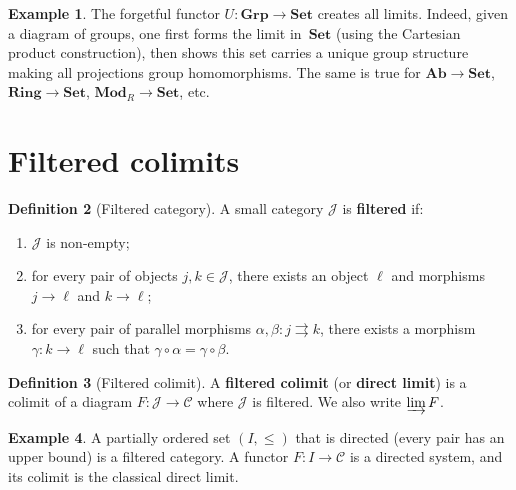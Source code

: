\documentclass[a4paper,12pt]{book}
\newcommand{\Set}{\mathbf{Set}}
\newcommand{\Grp}{\mathbf{Grp}}
\newcommand{\Ab}{\mathbf{Ab}}
\newcommand{\Ring}{\mathbf{Ring}}
\newcommand{\Mod}{\mathbf{Mod}}
\theoremstyle{definition}
\newtheorem{definition}{Definition}[section]
\newtheorem{example}[definition]{Example}
\theoremstyle{plain}
\theoremstyle{remark}
\begin{document}
\begin{example}\label{ex:forgetful-creates}
The forgetful functor $U\colon\Grp\to\Set$ creates all limits.
Indeed, given a diagram of groups, one first forms the limit in~$\Set$
(using the Cartesian product construction), then shows this set carries
a unique group structure making all projections group homomorphisms.
The same is true for $\Ab\to\Set$, $\Ring\to\Set$, $\Mod_R\to\Set$, etc.
\end{example}


\section{Filtered colimits}\label{sec:filtered-colimits}

\begin{definition}[Filtered category]\label{def:filtered-category}
A small category $\mathcal{J}$ is \textbf{filtered} if:
\begin{enumerate}[label=(\roman*)]
\item $\mathcal{J}$ is non-empty;
\item for every pair of objects $j,k\in\mathcal{J}$, there exists
      an object $\ell$ and morphisms $j\to\ell$ and $k\to\ell$;
\item for every pair of parallel morphisms $\alpha,\beta\colon j\rightrightarrows k$,
      there exists a morphism $\gamma\colon k\to\ell$ such that
      $\gamma\circ\alpha = \gamma\circ\beta$.
\end{enumerate}
\end{definition}

\begin{definition}[Filtered colimit]\label{def:filtered-colimit}
A \textbf{filtered colimit} (or \textbf{direct limit}) is a colimit
of a diagram $F\colon\mathcal{J}\to\mathcal{C}$ where $\mathcal{J}$
is filtered.  We also write $\varinjlim F$.
\end{definition}

\begin{example}\label{ex:filtered-colimit-directed}
A partially ordered set $(I,\leq)$ that is directed
(every pair has an upper bound) is a filtered category.
A functor $F\colon I\to\mathcal{C}$ is a directed system,
and its colimit is the classical direct limit.
\end{example}
\end{document}
